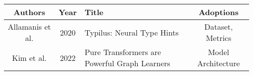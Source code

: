 \begin{tabularx}{\textwidth}{ccXc}
    \toprule
    Authors & Year & Title & Adoptions \\
    \midrule
    Allamanis et al. & 2020 & Typilus: Neural Type Hints & Dataset, Metrics \\
    Kim et al. & 2022 & Pure Transformers are Powerful Graph Learners & Model Architecture \\
    \bottomrule
\end{tabularx}